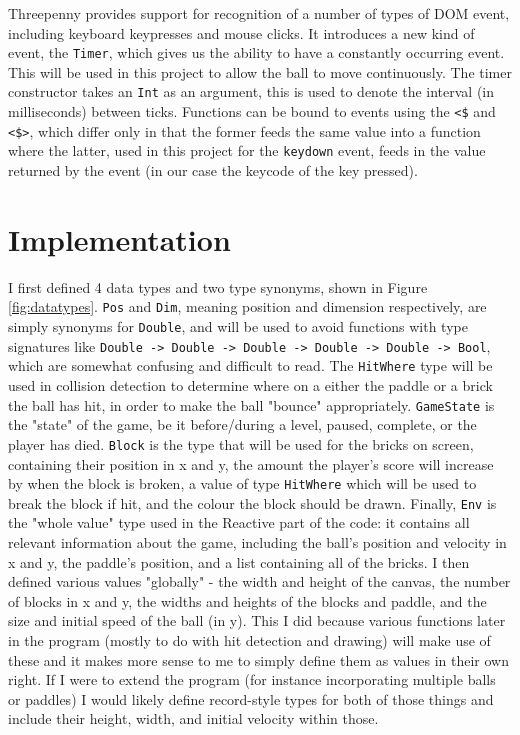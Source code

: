 \documentclass[12pt]{article}
\begin{document}
\par

Threepenny provides support for recognition of a number of types of DOM event, including keyboard keypresses and mouse clicks.
It introduces a new kind of event, the \verb|Timer|, which gives us the ability to have a constantly occurring event.
This will be used in this project to allow the ball to move continuously.
The timer constructor takes an \verb|Int| as an argument, this is used to denote the interval (in milliseconds) between ticks.
Functions can be bound to events using the \verb|<$| and \verb|<$>|, which differ only in that the former feeds the same value into a function where the latter, used in this project for the \verb|keydown| event, feeds in the value returned by the event (in our case the keycode of the key pressed).

\section{Implementation}

I first defined 4 data types and two type synonyms, shown in Figure \ref{fig:datatypes}.
\verb|Pos| and \verb|Dim|, meaning position and dimension respectively, are simply synonyms for \verb|Double|, and will be used to avoid functions with type signatures like \verb|Double -> Double -> Double -> Double -> Double -> Bool|, which are somewhat confusing and difficult to read.
The \verb|HitWhere| type will be used in collision detection to determine where on a either the paddle or a brick the ball has hit, in order to make the ball "bounce" appropriately.
\verb|GameState| is the "state" of the game, be it before/during a level, paused, complete, or the player has died.
\verb|Block| is the type that will be used for the bricks on screen, containing their position in x and y, the amount the player's score will increase by when the block is broken, a value of type \verb|HitWhere| which will be used to break the block if hit, and the colour the block should be drawn.
Finally, \verb|Env| is the "whole value" type used in the Reactive part of the code: it contains all relevant information about the game, including the ball's position and velocity in x and y, the paddle's position, and a list containing all of the bricks.
I then defined various values "globally" - the width and height of the canvas, the number of blocks in x and y, the widths and heights of the blocks and paddle, and the size and initial speed of the ball (in y).
This I did because various functions later in the program (mostly to do with hit detection and drawing) will make use of these and it makes more sense to me to simply define them as values in their own right.
If I were to extend the program (for instance incorporating multiple balls or paddles) I would likely define record-style types for both of those things and include their height, width, and initial velocity within those.
\end{document}
